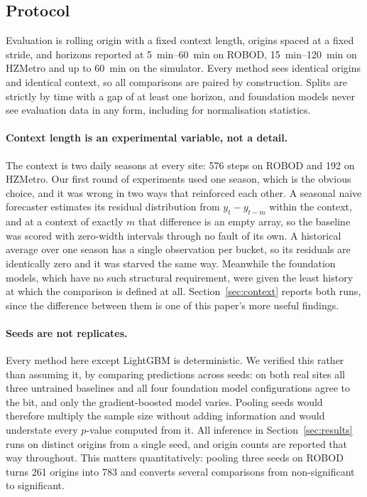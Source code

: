 \documentclass[11pt]{article}
\theoremstyle{plain}
\theoremstyle{definition}
\theoremstyle{remark}
\begin{document}
\subsection{Protocol}
\label{sec:protocol}

Evaluation is rolling origin with a fixed context length, origins spaced at a fixed stride, and horizons reported at \SIrange{5}{60}{\minute} on ROBOD, \SIrange{15}{120}{\minute} on HZMetro and up to \SI{60}{\minute} on the simulator. Every method sees identical origins and identical context, so all comparisons are paired by construction. Splits are strictly by time with a gap of at least one horizon, and foundation models never see evaluation data in any form, including for normalisation statistics.

\paragraph{Context length is an experimental variable, not a detail.}
The context is two daily seasons at every site: \num{576} steps on ROBOD and \num{192} on HZMetro. Our first round of experiments used one season, which is the obvious choice, and it was wrong in two ways that reinforced each other. A seasonal naive forecaster estimates its residual distribution from $y_t - y_{t-m}$ within the context, and at a context of exactly $m$ that difference is an empty array, so the baseline was scored with zero-width intervals through no fault of its own. A historical average over one season has a single observation per bucket, so its residuals are identically zero and it was starved the same way. Meanwhile the foundation models, which have no such structural requirement, were given the least history at which the comparison is defined at all. Section~\ref{sec:context} reports both runs, since the difference between them is one of this paper's more useful findings.

\paragraph{Seeds are not replicates.}
Every method here except LightGBM is deterministic. We verified this rather than assuming it, by comparing predictions across seeds: on both real sites all three untrained baselines and all four foundation model configurations agree to the bit, and only the gradient-boosted model varies. Pooling seeds would therefore multiply the sample size without adding information and would understate every $p$-value computed from it. All inference in Section~\ref{sec:results} runs on distinct origins from a single seed, and origin counts are reported that way throughout. This matters quantitatively: pooling three seeds on ROBOD turns \num{261} origins into \num{783} and converts several comparisons from non-significant to significant.
\end{document}
